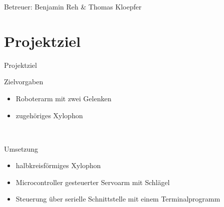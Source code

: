 \begin{frame}[label=title]{}
\titlepage
\begin{center} Betreuer: Benjamin Reh \& Thomas Kloepfer
\end{center}
\end{frame}
\begin{frame}[label=title]{}
\tableofcontents
\end{frame}

\section{Projektziel}
\begin{frame}{Projektziel}
\begin{exampleblock}{Zielvorgaben}
\begin{itemize}
\item Roboterarm mit zwei Gelenken
\item zugehöriges Xylophon
\end{itemize}
\end{exampleblock}
\\[0.5cm]
\begin{exampleblock}{Umsetzung}
\begin{itemize}
\item halbkreisförmiges Xylophon
\item Microcontroller gesteuerter Servoarm mit Schlägel
\item Steuerung über serielle Schnittstelle mit einem Terminalprogramm
\end{itemize}
\end{exampleblock}
\end{frame}

